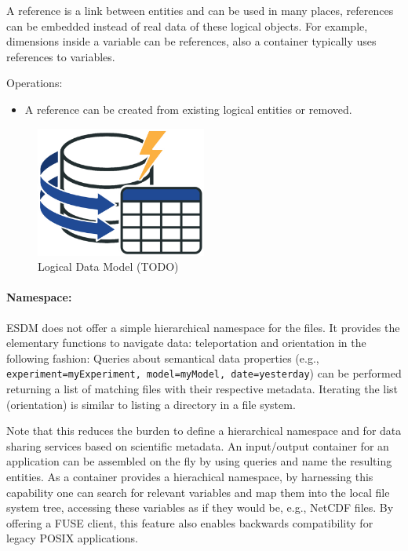 A reference is a link between entities and can be used in many places,
references can be embedded instead of real data of these logical
objects. For example, dimensions inside a variable can be references,
also a container typically uses references to variables.

Operations:

\begin{itemize}
  \item A reference can be created from existing logical entities or removed.
\end{itemize}

\begin{figure}
  \centering
  \includegraphics[width=0.5\textwidth]{../figures/data-model.png}
  \caption{Logical Data Model (TODO)}%
  \label{fig:data-model}
\end{figure}

\paragraph{Namespace:}%
\label{namespace}

ESDM does not offer a simple hierarchical namespace for the files. It
provides the elementary functions to navigate data: teleportation and
orientation in the following fashion: Queries about semantical data
properties (e.g.,
\texttt{experiment=myExperiment,\ model=myModel,\ date=yesterday}) can
be performed returning a list of matching files with their respective
metadata. Iterating the list (orientation) is similar to listing a
directory in a file system.

Note that this reduces the burden to define a hierarchical namespace and
for data sharing services based on scientific metadata. An input/output
container for an application can be assembled on the fly by using
queries and name the resulting entities. As a container provides a
hierachical namespace, by harnessing this capability one can search for
relevant variables and map them into the local file system tree,
accessing these variables as if they would be, e.g., NetCDF files. By
offering a FUSE client, this feature also enables backwards
compatibility for legacy POSIX applications.
